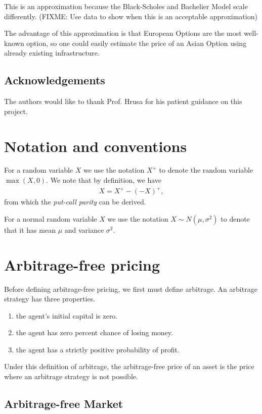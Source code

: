 \documentclass[reqno]{amsart}
\begin{document}
This is an approximation because the Black-Scholes and Bachelier Model scale differently.
(FIXME: Use data to show when this is an acceptable approximation)

The advantage of this approximation is that European Options are the most well-known option, so one could easily estimate
the price of an Asian Option using already existing infrastructure.


\subsection*{Acknowledgements} The authors would like to thank Prof. Hrusa for his patient guidance on this project.  


\appendix

\section{Notation and conventions}

For a random variable $X$ we use the notation $X^+$ to denote the random variable $\max(X,0)$. We note that by definition, we have 
\begin{align}\label{eq: pos part decomp}
      X = X^+ - (-X)^+,
\end{align}
from which the \emph{put-call parity} can be derived. 

For a normal random variable $X$ we use the notation $X \sim N(\mu,\sigma^2)$
to denote that it has mean $\mu$ and variance $\sigma^2$.

\section{Arbitrage-free pricing} \label{Arbitrage-Free Pricing Appendix}

Before defining arbitrage-free pricing, we first must define arbitrage. An arbitrage strategy has three properties. 
\begin{enumerate}
     \item the agent's initial capital is zero.
     \item the agent has zero percent chance of losing money.
     \item the agent has a strictly positive probability of profit. 
\end{enumerate}
Under this definition of arbitrage, the arbitrage-free price of an asset is the price where an arbitrage strategy is not possible.

\subsection{Arbitrage-free Market}
\end{document}
